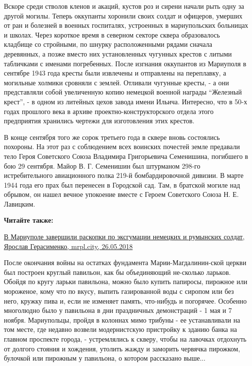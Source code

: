 Вскоре среди стволов кленов и акаций, кустов роз и сирени начали рыть одну за
другой могилы. Теперь оккупанты хоронили своих солдат и офицеров, умерших от
ран и болезней в военных госпиталях, устроенных в мариупольских больницах и
школах. Через короткое время в северном секторе сквера образовалось кладбище со
стройными, по шнурку расположенными рядами сначала деревянных, а позже вместо
них установленных чугунных крестов с литыми табличками с именами погребенных.
После изгнания оккупантов из Мариуполя в сентябре 1943 года кресты были
извлечены и отправлены на переплавку, а могильные холмики сровняли с землей.
Отливали чугунные кресты, - а они представляли собой увеличенную копию немецкой
военной награды \enquote{Железный крест}, - в одном из литейных цехов завода
имени Ильича. Интересно, что в 50-х годах прошлого века в архиве
проектно-конструкторского отдела этого предприятия хранились чертежи для
изготовления этих крестов.

В конце сентября того же сорок третьего года в сквере вновь состоялись
похороны. На этот раз с соблюдением всех воинских почестей земле предавали тело
Героя Советского Союза Владимира Григорьевича Семенишина, погибшего в бою 29
сентября. Майор В. Г. Семенишин был штурманом 298-го истребительного
авиационного полка 219-й бомбардировочной дивизии. В марте 1944 года его прах
был перенесен в Городской сад. Там, в братской могиле над обрывом, он нашел
вечное упокоение вместе с Героем Советского Союза Н. Е. Лавицким.

\textbf{Читайте также:} 

\href{https://mrpl.city/news/view/v-mariupole-zavershili-raskopki-po-e-ksgumatsii-nemetskih-i-rumynskih-soldat}{%
В Мариуполе завершили раскопки по эксгумации немецких и румынских солдат, Ярослав Герасименко, mrpl.city, 26.05.2018}

После окончания войны на остатках фундамента Марии-Магдалинин\hyp{}ской церкви был
построен круглый павильон, как бы объединяющий не\hyp{}сколько ларьков. Обойдя по
кругу ларьки павильона, можно было купить папиросы, пирожное или мороженое,
кому что по вкусу, выпить газированной воды с сиропом или без него, кружку пива
и, если не изменяет память, что-нибудь и погорячее. Особенно многолюдно было у
павильона в дни праздничных демонстраций - 1 мая и 7 ноября. Мариупольцы,
пройдя в колоннах мимо трибуны - ее устанавливали на том месте, где недавно
возвели модернистскую пристройку к зданию банка на главном проспекте города, -
устремлялись к скверу, чтобы на лавочках отдохнуть от долгого стояния и
хождения, утолить жажду и заморить червячка пирожком, булочкой или пирожным у
павильона, о котором рассказано выше...

